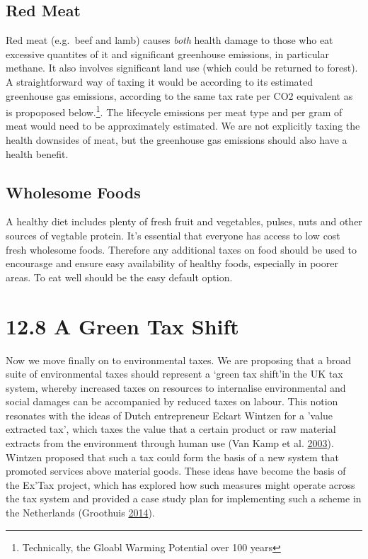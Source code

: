 \documentclass[]{tufte-handout}
\begin{document}
\hypertarget{red-meat}{%
\subsection{Red Meat}\label{red-meat}}

Red meat (e.g.~beef and lamb) causes \emph{both} health damage to those
who eat excessive quantites of it and significant greenhouse emissions,
in particular methane. It also involves significant land use (which
could be returned to forest). A straightforward way of taxing it would
be according to its estimated greenhouse gas emissions, according to the
same tax rate per CO2 equivalent as is propoposed below.\footnote{Technically,
  the Gloabl Warming Potential over 100 years}. The lifecycle emissions
per meat type and per gram of meat would need to be approximately
estimated. We are not explicitly taxing the health downsides of meat,
but the greenhouse gas emissions should also have a health benefit.

\hypertarget{wholesome-foods}{%
\subsection{Wholesome Foods}\label{wholesome-foods}}

A healthy diet includes plenty of fresh fruit and vegetables, pulses,
nuts and other sources of vegtable protein. It's essential that everyone
has access to low cost fresh wholesome foods. Therefore any additional
taxes on food should be used to encourasge and ensure easy availability
of healthy foods, especially in poorer areas. To eat well should be the
easy default option.

\hypertarget{a-green-tax-shift}{%
\section{12.8 A Green Tax Shift}\label{a-green-tax-shift}}

Now we move finally on to environmental taxes. We are proposing that a
broad suite of environmental taxes should represent a `green tax
shift'in the UK tax system, whereby increased taxes on resources to
internalise environmental and social damages can be accompanied by
reduced taxes on labour. This notion resonates with the ideas of Dutch
entrepreneur Eckart Wintzen for a 'value extracted tax', which taxes the
value that a certain product or raw material extracts from the
environment through human use (Van Kamp et al.
\protect\hyperlink{ref-VanKamp2003}{2003}). Wintzen proposed that such a
tax could form the basis of a new system that promoted services above
material goods. These ideas have become the basis of the Ex'Tax project,
which has explored how such measures might operate across the tax system
and provided a case study plan for implementing such a scheme in the
Netherlands (Groothuis \protect\hyperlink{ref-Groothuis2014}{2014}).
\end{document}
